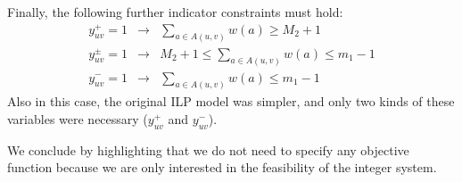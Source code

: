 \documentclass{fundam}
\begin{document}
%
Finally, the following further indicator constraints must hold:
%
\begin{equation}
 \begin{array}{lcl}
  y_{uv}^+ = 1 & \to & \sum_{a \in A(u,v)} w(a) \geq M_2 + 1 \\[0.1cm]
    y_{uv}^{\pm} = 1 & \to & M_2 +1 \leq \sum_{a \in A(u,v)} w(a) \leq m_1 - 1 \\[0.1cm]
  y_{uv}^- = 1 & \to & \sum_{a \in A(u,v)} w(a) \leq m_1 - 1
 \end{array}
 \label{eq:indminus}
\end{equation}
%
Also in this case, the original ILP model was simpler, and only two kinds of these variables were necessary ($y^+_{uv}$ and $y^-_{uv}$).

\medskip\noindent
We conclude by highlighting that we do not need to specify any objective function because we are only interested in the feasibility of the integer system.

%
% 
\end{document}
